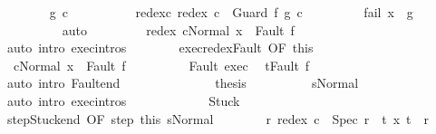 \begin{isabellebody}
\ \ \ \ \ \ \isamarkupfalse%
\ g\ c\ \ \isanewline
\ \ \ \ \ \ \ \ redex{\isacharunderscore}c\ {\isachardoublequoteopen}redex\ c\ {\isacharequal}\ Guard\ f\ g\ c{\isachardoublequoteclose}\ \isanewline
\ \ \ \ \ \ \ \ fail{\isacharcolon}\ {\isachardoublequoteopen}x\ {\isasymnotin}\ g{\isachardoublequoteclose}\isanewline
\ \ \ \ \ \ \ \ \isamarkupfalse%
\ auto\isanewline
\ \ \ \ \ \ \isamarkupfalse%
\ {\isachardoublequoteopen}{\isasymGamma}{\isasymturnstile}\ {\isasymlangle}redex\ cNormal\ x{\isasymrangle}\ {\isasymRightarrow}\ Fault\ f{\isachardoublequoteclose}\isanewline
\ \ \ \ \ \ \ \ \isamarkupfalse%
\ {\isacharparenleft}auto\ intro{\isacharcolon}\ exec{\isachardot}intros{\isacharparenright}\isanewline
\ \ \ \ \ \ \isamarkupfalse%
\ exec{\isacharunderscore}redex{\isacharunderscore}Fault\ {\isacharbrackleft}OF\ this{\isacharbrackright}\isanewline
\ \ \ \ \ \ \isamarkupfalse%
\ {\isachardoublequoteopen}{\isasymGamma}{\isasymturnstile}\ {\isasymlangle}cNormal\ x{\isasymrangle}\ {\isasymRightarrow}\ Fault\ f{\isachardoublequoteclose}\isacommand{{\isachardot}}\isamarkupfalse%
\isanewline
\ \ \ \ \ \ \isamarkupfalse%
\ \isamarkupfalse%
\ Fault\ exec{\isacharprime}\ \isamarkupfalse%
\ {\isachardoublequoteopen}t{\isacharequal}Fault\ f{\isachardoublequoteclose}\isanewline
\ \ \ \ \ \ \ \ \isamarkupfalse%
\ {\isacharparenleft}auto\ intro{\isacharcolon}\ Fault{\isacharunderscore}end{\isacharparenright}\isanewline
\ \ \ \ \ \ \isamarkupfalse%
\isanewline
\ \ \ \ \ \ \isamarkupfalse%
\ {\isacharquery}thesis\isanewline
\ \ \ \ \ \ \ \ \isamarkupfalse%
\ s{\isacharunderscore}Normal\isanewline
\ \ \ \ \ \ \ \ \isamarkupfalse%
\ {\isacharparenleft}auto\ intro{\isacharcolon}\ exec{\isachardot}intros{\isacharparenright}\isanewline
\ \ \ \ \isamarkupfalse%
\isanewline
\ \ \ \ \ \ \isamarkupfalse%
\ Stuck\isanewline
\ \ \ \ \ \ \isamarkupfalse%
\ step{\isacharunderscore}Stuck{\isacharunderscore}end\ {\isacharbrackleft}OF\ step\ this{\isacharbrackright}\ s{\isacharunderscore}Normal\isanewline
\ \ \ \ \ \ \isamarkupfalse%
\ {\isachardoublequoteopen}{\isacharparenleft}{\isasymexists}r{\isachardot}\ redex\ c\ {\isacharequal}\ Spec\ r\ {\isasymand}\ {\isacharparenleft}{\isasymforall}t{\isachardot}\ {\isacharparenleft}x{\isacharcomma}\ t{\isacharparenright}\ {\isasymnotin}\ r{\isacharparenright}{\isacharparenright}\ {\isasymor}\isanewline

\end{isabellebody}
